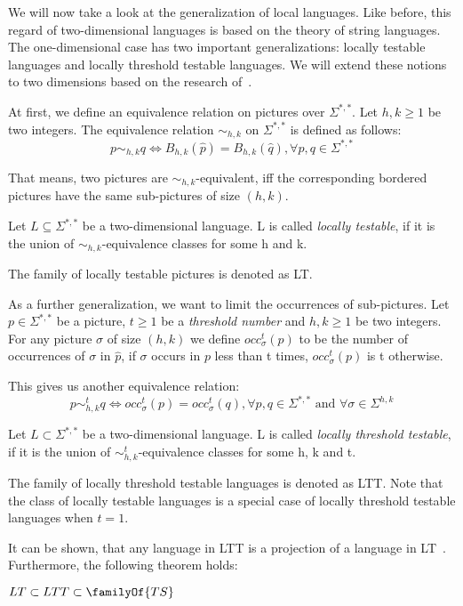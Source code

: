 We will now take a look at the generalization of local languages. Like before, this regard of two-dimensional languages is based on the theory of string languages. The one-dimensional case has two important generalizations: locally testable languages and locally threshold testable languages. We will extend these notions to two dimensions based on the research of~\cite{giammarresi1997twodimensional}. 

At first, we define an equivalence relation on pictures over $\Sigma^{*, *}$. Let $h,k \geq 1$ be two integers. The equivalence relation $\sim_{h, k}$ on $\Sigma^{*, *}$ is defined as follows: \[p \sim_{h, k} q \Leftrightarrow B_{h, k}(\hat{p}) = B_{h, k}(\hat{q}), \forall p, q \in \Sigma^{*, *}\]

That means, two pictures are $\sim_{h, k}$-equivalent, iff the corresponding bordered pictures have the same sub-pictures of size $(h, k)$. 

\begin{definition}
	Let $L \subseteq \Sigma^{*, *}$ be a two-dimensional language. L is called \emph{locally testable}, if it is the union of $\sim_{h, k}$-equivalence classes for some h and k. 
\end{definition}

The family of locally testable pictures is denoted as LT. 

As a further generalization, we want to limit the occurrences of sub-pictures. Let $p \in \Sigma^{*, *}$ be a picture, $t \geq 1$ be a \emph{threshold number} and $h, k \geq 1$ be two integers. For any picture $\sigma$ of size $(h, k)$ we define $occ_\sigma^t(p)$ to be the number of occurrences of $\sigma$ in $\hat{p}$, if $\sigma$ occurs in $p$ less than t times,  $occ_\sigma^t(p)$ is t otherwise. 

This gives us another equivalence relation: \[p \sim_{h, k}^t q \Leftrightarrow occ_\sigma^t(p) = occ_\sigma^t(q), \forall p, q \in \Sigma^{*, *} \text{ and } \forall \sigma \in \Sigma^{h, k}\]

\begin{definition}
	Let $L \subset \Sigma^{*, *}$ be a two-dimensional language. L is called \emph{locally threshold testable}, if it is the union of $\sim_{h, k}^t$-equivalence classes for some h, k and t. 
\end{definition}

The family of locally threshold testable languages is denoted as LTT. Note that the class of locally testable languages is a special case of locally threshold testable languages when $t = 1$. 

It can be shown, that any language in LTT is a projection of a language in LT~\cite{giammarresi1997twodimensional}. Furthermore, the following theorem holds: 

\begin{theorem}
	$LT \subset LTT \subset \familyOf{TS}$
\end{theorem}